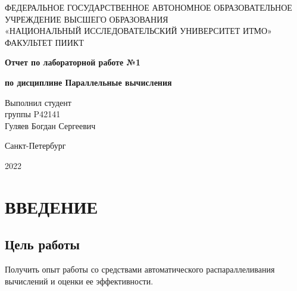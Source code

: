 \documentclass[14pt, a4paper, oneside, final]{extarticle}
\begin{document}
 
\setcounter{page}{0}
\begin{center} 
\small
\footnotesize{ФЕДЕРАЛЬНОЕ ГОСУДАРСТВЕННОЕ АВТОНОМНОЕ ОБРАЗОВАТЕЛЬНОЕ}\\
\footnotesize{УЧРЕЖДЕНИЕ ВЫСШЕГО ОБРАЗОВАНИЯ}\\ 
\footnotesize{«НАЦИОНАЛЬНЫЙ ИССЛЕДОВАТЕЛЬСКИЙ УНИВЕРСИТЕТ ИТМО»}\\
\hfill \break 
\footnotesize{ФАКУЛЬТЕТ ПИИКТ}\\
\hfill \break
\hfill \break 
\hfill \break
\large{
    \textbf{Отчет по лабораторной работе №1}

    \textbf{по дисциплине Параллельные вычисления}
}

\hfill \break 
\end{center} 
\begin{flushright} 
Выполнил студент\\
группы P42141\\
Гуляев Богдан Сергеевич\\
\end{flushright}
\vspace*{\fill}
\begin{center}
Санкт-Петербург

2022
\end{center}
\normalsize
\thispagestyle{empty} 
\clearpage
\def\contentsname{ОГЛАВЛЕНИЕ}
\tableofcontents 

\clearpage
\section*{ВВЕДЕНИЕ}
\subsection*{Цель работы}
Получить опыт работы со средствами автоматического распараллеливания вычислений и оценки ее эффективности.
\end{document}
